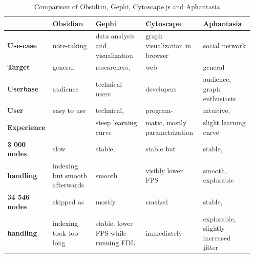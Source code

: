 \begin{table}[ht]
    \centering
    \caption{Comparison of Obsidian, Gephi, Cytoscape.js and Aphantasia}
    \label{tab:comparison_2}
    \begin{tabularx}{\textwidth}{|l|X|X|X|X|}
      \hline
      \textbf{}                     & \textbf{Obsidian}       & \textbf{Gephi}                      & \textbf{Cytoscape}                & \textbf{Aphantasia} \\ \hline
      \textbf{Use-case}             & note-taking             & data analysis and visualization     & graph visualization in browser    & social network \\ \hline
      \textbf{Target}               & general                 & researchers,                        & web                               & general \\ 
      \textbf{Userbase}             &  audience               & technical users                     & developers                        & audience, graph enthusiasts \\ \hline
      \textbf{User}                 & easy to use             & technical,                          & program-                          & intuitive, \\
      \textbf{Experience}           &                         & steep learning curve                & matic, mostly parametrization     & slight learning curve\\ \hline
      \textbf{3 000 nodes}          & slow                    & stable,                             & stable but                        & stable, \\ 
      \textbf{handling}             & indexing but smooth afterwards & smooth                              & visibly lower FPS                 & smooth, explorable \\ \hline
      \textbf{34 546 nodes}         & skipped as              & mostly                              & crashed                           & stable, \\ 
      \textbf{handling}             & indexing took too long  & stable, lower FPS while running FDL & immediately                       & explorable, slightly increased jitter \\ \hline
    \end{tabularx}
  \end{table}
